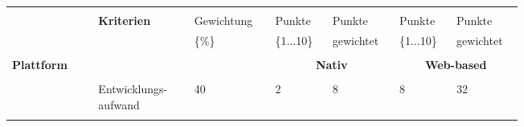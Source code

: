 \documentclass[main.tex]{subfiles} %
\begin{document}
\begin{table}[H]
    \centering
    \begin{tabular}{|p{0.14\linewidth}|p{0.15\linewidth}|p{0.115\linewidth}|p{0.08\linewidth}|p{0.09\linewidth}|p{0.08\linewidth}|p{0.09\linewidth}|}
        \hline
                                                           &                                     &                                              &                                                &             &            &             \\[-9pt]
                                                           & \multirow{2}{*}{\textbf{Kriterien}} & Gewichtung                                   & Punkte                                         & Punkte      & Punkte     & Punkte      \\[1pt]
                                                           &                                     & \{\%\}                                       & \{1...10\}                                     & gewichtet   & \{1...10\} & gewichtet   \\[1pt]
        \hline
        \hline
                                                           & \multicolumn{2}{c|}{}               & \multicolumn{2}{c|}{}                        & \multicolumn{2}{c|}{}                                                                   \\[-9pt]
        \multirow{5}{4em}{\textbf{Plattform}}              & \multicolumn{2}{c|}{}               & \multicolumn{2}{c|}{\textbf{Nativ}}          & \multicolumn{2}{c|}{\textbf{Web-based}}                                                 \\[1pt]
        \cline{2-7}
                                                           &                                     &                                              &                                                &             &            &             \\[-9pt]
                                                           & Entwicklungs-aufwand                & 40                                           & 2                                              & 8           & 8          & 32          \\[1pt]
        \cline{2-7}
                                                           &                                     &                                              &                                                &             &            &             \\[-9pt]

\end{tabular}
\end{table}
\end{document}
